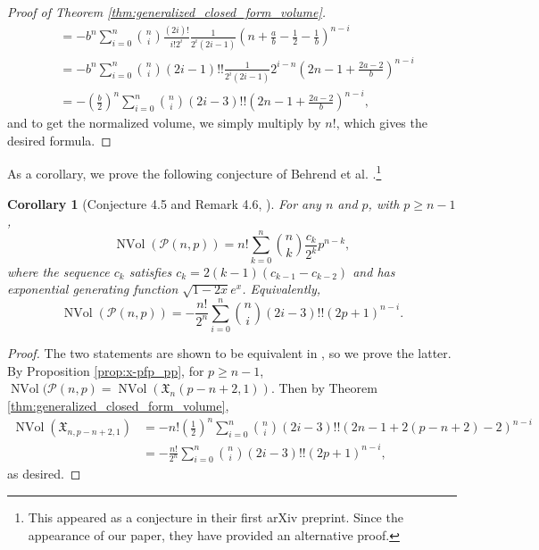 \documentclass[11pt]{amsart}
\newtheorem{corollary}[theorem]{Corollary}
\theoremstyle{definition}
\newcommand{\0}{\emptyset}
\DeclareMathOperator{\nVol}{NVol}
\begin{document}
\begin{proof}[Proof of Theorem \ref{thm:generalized_closed_form_volume}]
\begin{align*}
    &= -b^n \sum_{i=0}^n \binom{n}{i}\frac{(2i)!}{i!2^{i}} \frac{1}{2^i(2i-1)}\left(n + \frac{a}{b} - \frac{1}{2} - \frac{1}{b}\right)^{n-i}\\
    &= -b^n \sum_{i=0}^n \binom{n}{i}(2i-1)!!\frac{1}{2^i(2i-1)}2^{i-n}\left(2n - 1 + \frac{2a-2}{b}\right)^{n-i}\\
    &= -\left(\frac{b}{2}\right)^n \sum_{i=0}^n \binom{n}{i}(2i-3)!!\left(2n - 1 + \frac{2a-2}{b}\right)^{n-i},
\end{align*}
\endgroup
and to get the normalized volume, we simply multiply by $n!$, which gives the desired formula.
\end{proof}


As a corollary, we prove the following conjecture of Behrend et al. \cite{BCC}.\footnote{This appeared as a conjecture in their first arXiv preprint. Since the appearance of our paper, they have provided an alternative proof.}

\begin{corollary}[Conjecture 4.5 and Remark 4.6, \cite{BCC}]\label{cor:conjecture}
For any $n$ and $p$, with $p \geq n-1$, 
\begin{equation}
    \nVol(\mathcal{P}(n,p)) = n! \sum_{k=0}^n \binom{n}{k}\frac{c_k}{2^k}p^{n-k},
\end{equation}
where the sequence $c_k$ satisfies $c_k = 2(k-1)(c_{k-1}-c_{k-2})$ and has exponential generating function $\sqrt{1-2x}e^x$. Equivalently,
\begin{equation}\label{eq:red_conjecture}
    \nVol(\mathcal{P}(n,p)) = - \frac{n!}{2^n}\sum_{i=0}^n \binom{n}{i}(2i-3)!!(2p+1)^{n-i}.
\end{equation}
\end{corollary}

\begin{proof}
The two statements are shown to be equivalent in \cite{BCC}, so we prove the latter.
By Proposition \ref{prop:x-pfp_pp}, for $p \geq n-1$, $\nVol(\mathcal{P}(n,p) = \nVol(\mathfrak{X}_{n}(p-n+2,1))$. 
Then by Theorem \ref{thm:generalized_closed_form_volume},
\begin{align*}
    \nVol(\mathfrak{X}_{n,p-n+2,1}) &= -n!\left(\frac{1}{2}\right)^n \sum_{i=0}^n \binom{n}{i} (2i-3)!! \left(2n-1 + 2(p-n+2)-2\right)^{n-i}\\
    &= -\frac{n!}{2^n} \sum_{i=0}^n \binom{n}{i} (2i-3)!! (2p+1)^{n-i},
\end{align*}
as desired.
\end{proof}

\end{document}
